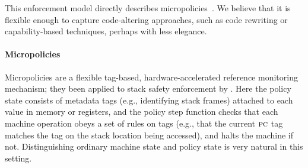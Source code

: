 \documentclass[acmsmall,review,anonymous]{acmart}\settopmatter{printfolios=true,printccs=false,printacmref=false}
\begin{document}

This enforcement model directly describes micropolicies~\citep{pump_oakland2015}.
We believe that it is flexible enough to capture code-altering approaches, such as code
rewriting or capability-based techniques, perhaps with less elegance.

\newcommand{\TAGS}{\mathcal{T}}
\newcommand{\tagname}{t}
\newcommand{\uP}{{\mu P}}

\paragraph*{Micropolicies}
%
Micropolicies are a flexible tag-based, hardware-accelerated
reference monitoring mechanism; they been applied to stack safety
enforcement by \citet{DBLP:conf/sp/RoesslerD18}.
Here the policy state consists of metadata tags (e.g., identifying stack frames)
attached to each value in memory or registers, and the policy step
function checks that each machine operation obeys a set of rules on tags
(e.g., that the current $\textsc{pc}$ tag matches the tag on the stack
location being accessed), and halts the machine if not.  Distinguishing
ordinary machine state and policy state is very natural in this setting.


\ifaftersubmission{}\fi
\end{document}
